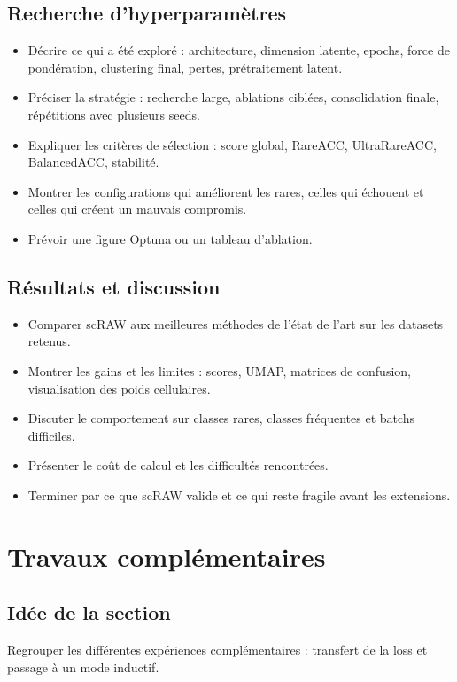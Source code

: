 \subsection{Recherche d'hyperparamètres}
\begin{itemize}
  \item Décrire ce qui a été exploré : architecture, dimension latente, epochs, force de pondération, clustering final, pertes, prétraitement latent.
  \item Préciser la stratégie : recherche large, ablations ciblées, consolidation finale, répétitions avec plusieurs seeds.
  \item Expliquer les critères de sélection : score global, RareACC, UltraRareACC, BalancedACC, stabilité.
  \item Montrer les configurations qui améliorent les rares, celles qui échouent et celles qui créent un mauvais compromis.
  \item Prévoir une figure Optuna ou un tableau d'ablation.
\end{itemize}

\subsection{Résultats et discussion}
\begin{itemize}
  \item Comparer scRAW aux meilleures méthodes de l'état de l'art sur les datasets retenus.
  \item Montrer les gains et les limites : scores, UMAP, matrices de confusion, visualisation des poids cellulaires.
  \item Discuter le comportement sur classes rares, classes fréquentes et batchs difficiles.
  \item Présenter le coût de calcul et les difficultés rencontrées.
  \item Terminer par ce que scRAW valide et ce qui reste fragile avant les extensions.
\end{itemize}

\section{Travaux complémentaires}

\subsection*{Idée de la section}
Regrouper les différentes expériences complémentaires : transfert de la loss et passage à un mode inductif.

